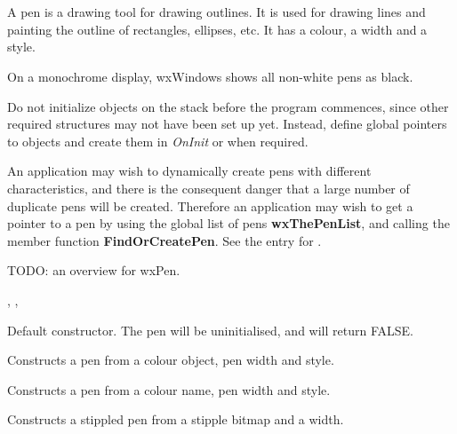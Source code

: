 \section{}\label{wxpen}

A pen is a drawing tool for drawing outlines. It is used for drawing
lines and painting the outline of rectangles, ellipses, etc. It has a
colour, a width and a style. 


On a monochrome display, wxWindows shows all non-white pens as black.

Do not initialize objects on the stack before the program commences,
since other required structures may not have been set up yet. Instead,
define global pointers to objects and create them in {\it OnInit} or
when required.

An application may wish to dynamically create pens with different
characteristics, and there is the consequent danger that a large number
of duplicate pens will be created. Therefore an application may wish to
get a pointer to a pen by using the global list of pens {\bf
wxThePenList}, and calling the member function {\bf FindOrCreatePen}.
See the entry for .

TODO: an overview for wxPen.


, , 


\label{wxpenconstr}


Default constructor. The pen will be uninitialised, and  will
return FALSE.


Constructs a pen from a colour object, pen width and style.


Constructs a pen from a colour name, pen width and style.


Constructs a stippled pen from a stipple bitmap and a width.

